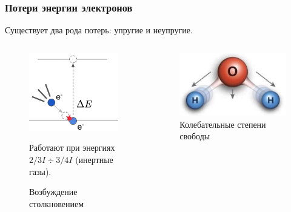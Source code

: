 \documentclass{beamer}
\begin{document}
	\begin{frame}
		\frametitle{Потери энергии электронов}
		
		Существует два рода потерь: упругие и неупругие.
		
		\begin{columns}[t]
			\begin{figure}
				\centering
				\includegraphics[width=0.8\linewidth]{res/excitation.png}
				\caption*{Возбуждение столкновением}
			
				Работают при энергиях $2/3I \div 3/4I$ (инертные газы).
			\end{figure}
		
			\vspace{10pt}
			\begin{figure}
				\centering
				\includegraphics[width=1.0\linewidth]{res/vibrations.jpg}
				\caption*{Колебательные степени свободы}
				

\end{figure}
\end{columns}
\end{frame}
\end{document}
